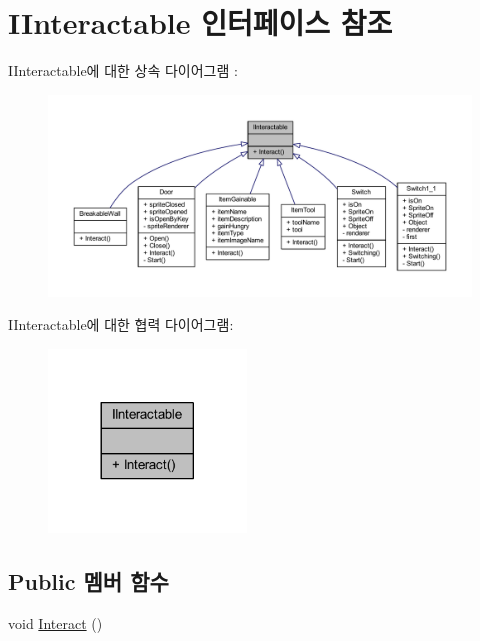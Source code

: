 \hypertarget{interface_i_interactable}{}\section{I\+Interactable 인터페이스 참조}
\label{interface_i_interactable}


I\+Interactable에 대한 상속 다이어그램 \+: \nopagebreak
\begin{figure}[H]
\begin{center}
\leavevmode
\includegraphics[width=350pt]{df/ddf/interface_i_interactable__inherit__graph}
\end{center}
\end{figure}


I\+Interactable에 대한 협력 다이어그램\+:\nopagebreak
\begin{figure}[H]
\begin{center}
\leavevmode
\includegraphics[width=149pt]{d4/de0/interface_i_interactable__coll__graph}
\end{center}
\end{figure}
\subsection*{Public 멤버 함수}
\begin{DoxyCompactItemize}
\item 
void \mbox{\hyperlink{interface_i_interactable_a6e8c9bc1f27bc2a5c81f674ceeac024c}{Interact}} ()
\end{DoxyCompactItemize}


